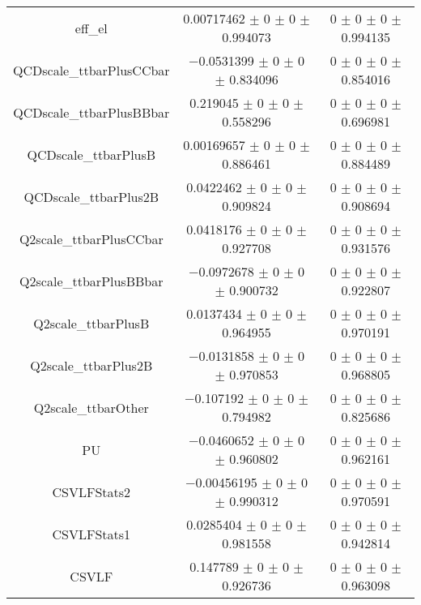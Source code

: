 \begin{table}
\begin{tabular}{ccc}
eff\_el 	& \num{0.00717462} $\pm$ \num{0} $\pm$ \num{0} $\pm$ \num{0.994073} 	& \num{0} $\pm$ \num{0} $\pm$ \num{0} $\pm$ \num{0.994135}\\
QCDscale\_ttbarPlusCCbar 	& \num{-0.0531399} $\pm$ \num{0} $\pm$ \num{0} $\pm$ \num{0.834096} 	& \num{0} $\pm$ \num{0} $\pm$ \num{0} $\pm$ \num{0.854016}\\
QCDscale\_ttbarPlusBBbar 	& \num{0.219045} $\pm$ \num{0} $\pm$ \num{0} $\pm$ \num{0.558296} 	& \num{0} $\pm$ \num{0} $\pm$ \num{0} $\pm$ \num{0.696981}\\
QCDscale\_ttbarPlusB 	& \num{0.00169657} $\pm$ \num{0} $\pm$ \num{0} $\pm$ \num{0.886461} 	& \num{0} $\pm$ \num{0} $\pm$ \num{0} $\pm$ \num{0.884489}\\
QCDscale\_ttbarPlus2B 	& \num{0.0422462} $\pm$ \num{0} $\pm$ \num{0} $\pm$ \num{0.909824} 	& \num{0} $\pm$ \num{0} $\pm$ \num{0} $\pm$ \num{0.908694}\\
Q2scale\_ttbarPlusCCbar 	& \num{0.0418176} $\pm$ \num{0} $\pm$ \num{0} $\pm$ \num{0.927708} 	& \num{0} $\pm$ \num{0} $\pm$ \num{0} $\pm$ \num{0.931576}\\
Q2scale\_ttbarPlusBBbar 	& \num{-0.0972678} $\pm$ \num{0} $\pm$ \num{0} $\pm$ \num{0.900732} 	& \num{0} $\pm$ \num{0} $\pm$ \num{0} $\pm$ \num{0.922807}\\
Q2scale\_ttbarPlusB 	& \num{0.0137434} $\pm$ \num{0} $\pm$ \num{0} $\pm$ \num{0.964955} 	& \num{0} $\pm$ \num{0} $\pm$ \num{0} $\pm$ \num{0.970191}\\
Q2scale\_ttbarPlus2B 	& \num{-0.0131858} $\pm$ \num{0} $\pm$ \num{0} $\pm$ \num{0.970853} 	& \num{0} $\pm$ \num{0} $\pm$ \num{0} $\pm$ \num{0.968805}\\
Q2scale\_ttbarOther 	& \num{-0.107192} $\pm$ \num{0} $\pm$ \num{0} $\pm$ \num{0.794982} 	& \num{0} $\pm$ \num{0} $\pm$ \num{0} $\pm$ \num{0.825686}\\
PU 	& \num{-0.0460652} $\pm$ \num{0} $\pm$ \num{0} $\pm$ \num{0.960802} 	& \num{0} $\pm$ \num{0} $\pm$ \num{0} $\pm$ \num{0.962161}\\
CSVLFStats2 	& \num{-0.00456195} $\pm$ \num{0} $\pm$ \num{0} $\pm$ \num{0.990312} 	& \num{0} $\pm$ \num{0} $\pm$ \num{0} $\pm$ \num{0.970591}\\
CSVLFStats1 	& \num{0.0285404} $\pm$ \num{0} $\pm$ \num{0} $\pm$ \num{0.981558} 	& \num{0} $\pm$ \num{0} $\pm$ \num{0} $\pm$ \num{0.942814}\\
CSVLF 	& \num{0.147789} $\pm$ \num{0} $\pm$ \num{0} $\pm$ \num{0.926736} 	& \num{0} $\pm$ \num{0} $\pm$ \num{0} $\pm$ \num{0.963098}\\

\end{tabular}
\end{table}
